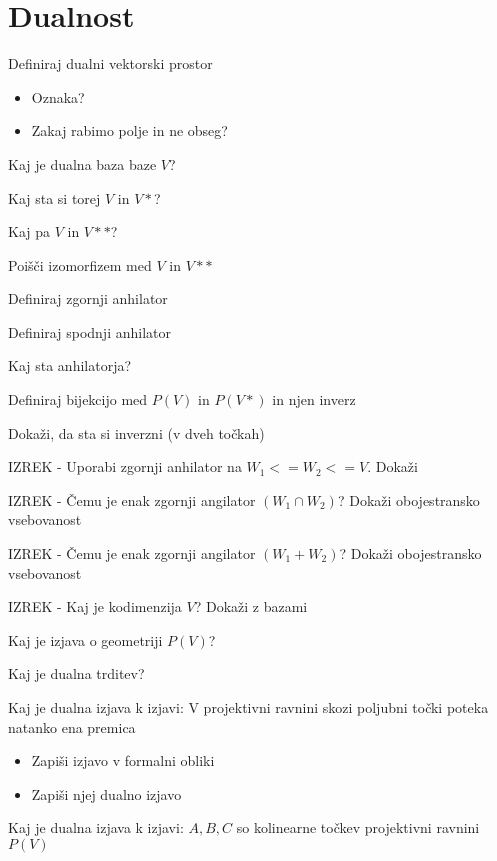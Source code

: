 \documentclass{article}
\begin{document}
    \section{Dualnost}
    \begin{enumerate}
        \item Definiraj dualni vektorski prostor
        \begin{itemize}
            \item Oznaka?
            \item Zakaj rabimo polje in ne obseg?
        \end{itemize}
        \item Kaj je dualna baza baze $V$?
        \item Kaj sta si torej $V$ in $V*$?
        \item Kaj pa $V$ in $V**$?
        {\color{red}\item Poišči izomorfizem med $V$ in $V**$}
        \item Definiraj zgornji anhilator
        \item Definiraj spodnji anhilator
        \item Kaj sta anhilatorja?
        \item Definiraj bijekcijo med $P(V)$ in $P(V*)$ in njen inverz
        {\color{red}\item Dokaži, da sta si inverzni (v dveh točkah)}
        \item IZREK - Uporabi zgornji anhilator na $W_1 <= W_2 <= V$. Dokaži
        {\color{red}\item IZREK - Čemu je enak zgornji angilator $(W_1  \cap W_2)$? Dokaži obojestransko vsebovanost}
        {\color{red}\item IZREK - Čemu je enak zgornji angilator $(W_1  + W_2)$? Dokaži obojestransko vsebovanost}
        {\color{red}\item IZREK - Kaj je kodimenzija $V$? Dokaži z bazami}
        \item Kaj je izjava o geometriji $P(V)$?
        \item Kaj je dualna trditev?
        \item Kaj je dualna izjava k izjavi: V projektivni ravnini skozi poljubni točki poteka natanko ena premica
        \begin{itemize}
            \item Zapiši izjavo v formalni obliki
            \item Zapiši njej dualno izjavo
        \end{itemize}
        \item Kaj je dualna izjava k izjavi: $A, B, C$ so kolinearne točkev projektivni ravnini $P(V)$

\end{enumerate}
\end{document}
